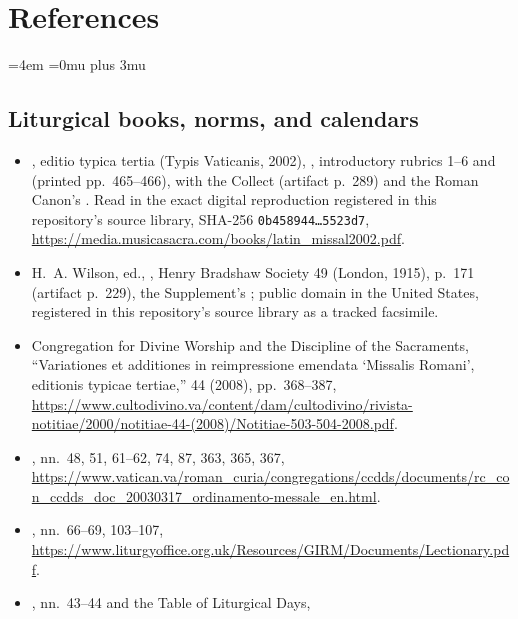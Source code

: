 \section*{References}

\begingroup
\sloppy
\raggedright
\emergencystretch=4em
\Urlmuskip=0mu plus 3mu

\subsection*{Liturgical books, norms, and calendars}

\begin{itemize}
\item {}, editio typica tertia (Typis Vaticanis, 2002),
  , introductory rubrics 1--6 and
   (printed pp.\ 465--466), with the
   Collect (artifact p.\ 289) and the Roman Canon's
  .
  Read in the exact digital reproduction registered in this repository's source
  library, SHA-256 \texttt{0b458944\dots 5523d7},
  \url{https://media.musicasacra.com/books/latin_missal2002.pdf}.
\item H.~A. Wilson, ed., , Henry Bradshaw Society 49 (London, 1915), p.\ 171 (artifact p.\ 229),
  the Supplement's  ; public domain in the United States, registered in this repository's
  source library as a tracked facsimile.
\item Congregation for Divine Worship and the Discipline of the Sacraments,
  ``Variationes et additiones in reimpressione emendata `Missalis Romani',
  editionis typicae tertiae,''  44 (2008), pp.\ 368--387,
  \url{https://www.cultodivino.va/content/dam/cultodivino/rivista-notitiae/2000/notitiae-44-(2008)/Notitiae-503-504-2008.pdf}.
\item {}, nn.\ 48, 51, 61--62, 74,
  87, 363, 365, 367,
  \url{https://www.vatican.va/roman_curia/congregations/ccdds/documents/rc_con_ccdds_doc_20030317_ordinamento-messale_en.html}.
\item {}, nn.\ 66--69, 103--107,
  \url{https://www.liturgyoffice.org.uk/Resources/GIRM/Documents/Lectionary.pdf}.
\item {}, nn.\
  43--44 and the Table of Liturgical Days,

\end{itemize}
